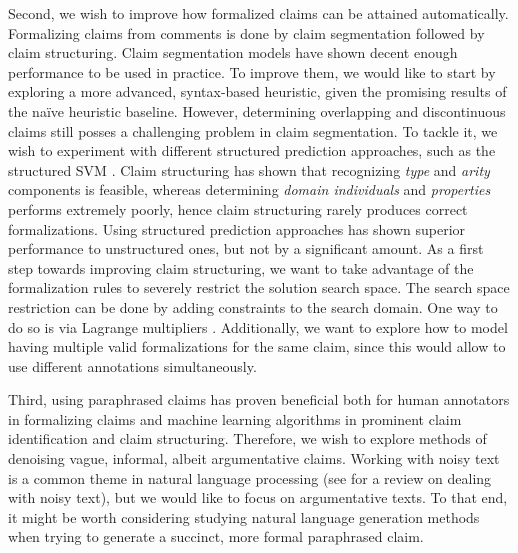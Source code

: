 Second, we wish to improve how formalized claims can be attained automatically.
Formalizing claims from comments is done by claim segmentation followed by
claim structuring.  Claim segmentation models have shown decent enough
performance to be used in practice. To improve them, we would like to start by
exploring a more advanced, syntax-based heuristic, given the promising results
of the na\"ive heuristic baseline.  However, determining overlapping and
discontinuous claims still posses a challenging problem in claim segmentation.
To tackle it, we wish to experiment with different structured prediction approaches, such as
the structured SVM \citep{mcdonald2005flexible}. Claim structuring has shown
that recognizing \emph{type} and \emph{arity} components is feasible,
whereas determining \emph{domain individuals} and \emph{properties}
performs extremely poorly, hence claim structuring rarely produces correct formalizations.
Using structured prediction approaches has shown superior performance 
to unstructured ones, but not by a significant amount.  
As a first step towards improving claim structuring,
we want to take advantage of the formalization rules to severely
restrict the solution search space. The search space restriction can be done by
adding constraints to the search domain. One way to do so is via Lagrange
multipliers \citep{bellman1956dynamic}. Additionally, we want to explore
how to model having multiple valid formalizations for the same claim, since this would
allow to use different annotations simultaneously. 

Third, using paraphrased claims has proven beneficial both for human annotators
in formalizing claims and machine learning algorithms in prominent claim
identification and claim structuring. Therefore, we wish to explore methods of
denoising vague, informal, albeit argumentative claims.
Working with noisy text is a common theme in natural language processing 
(see \citep{subramaniam2009survey} for a review on dealing with noisy text),
but we would like to focus on argumentative texts. To that end, it might be worth
considering studying natural language generation methods when trying to
generate a succinct, more formal paraphrased claim.  



